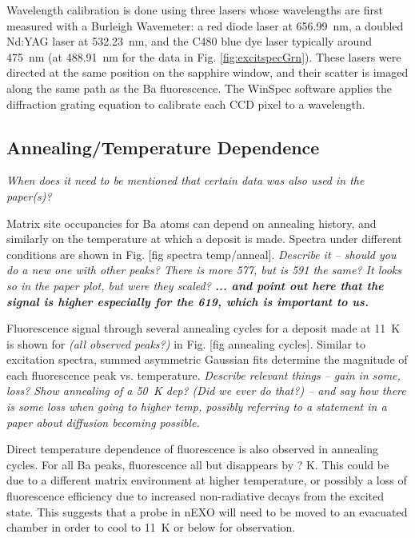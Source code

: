 Wavelength calibration is done using three lasers whose wavelengths are first measured with a Burleigh Wavemeter:  a red diode laser at 656.99~nm, a doubled Nd:YAG laser at 532.23~nm, and the C480 blue dye laser typically around 475~nm (at 488.91~nm for the data in Fig. \ref{fig:excitspecGrn}).  These lasers were directed at the same position on the sapphire window, and their scatter is imaged along the same path as the Ba fluorescence.  The WinSpec software applies the diffraction grating equation to calibrate each CCD pixel to a wavelength.

\subsection{Annealing/Temperature Dependence}
\label{subsec:tempanneal}

\emph{\color{gray}When does it need to be mentioned that certain data was also used in the paper(s)?}

Matrix site occupancies for Ba atoms can depend on annealing history, and similarly on the temperature at which a deposit is made.  Spectra under different conditions are shown in Fig. [fig spectra temp/anneal].  \emph{\color{gray}Describe it -- should you do a new one with other peaks?  There is more 577, but is 591 the same? It looks so in the paper plot, but were they scaled? \textbf{... and point out here that the signal is higher especially for the 619, which is important to us.}}  

Fluorescence signal through several annealing cycles for a deposit made at 11~K is shown for \emph{\color{gray}(all observed peaks?)} in Fig. [fig annealing cycles].  Similar to excitation spectra, {\color{red}summed asymmetric Gaussian} fits determine the magnitude of each fluorescence peak vs. temperature.  \emph{\color{gray}Describe relevant things -- gain in some, loss?  Show annealing of a 50~K dep? (Did we ever do that?) -- and say how there is some loss when going to higher temp, possibly referring to a statement in a paper about diffusion becoming possible.}

Direct temperature dependence of fluorescence is also observed in annealing cycles.  For all Ba peaks, fluorescence all but disappears by ? K.  This could be due to a different matrix environment at higher temperature, or possibly a loss of fluorescence efficiency due to increased non-radiative decays from the excited state.  This suggests that a probe in nEXO will need to be moved to an evacuated chamber in order to cool to 11~K or below for observation.

